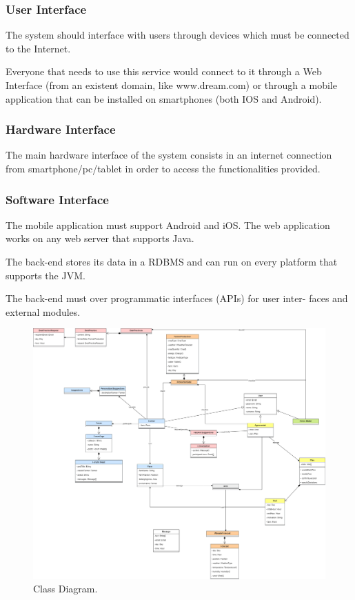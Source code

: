 \documentclass{article}
\begin{document}
\subsubsection{User Interface}

    The system should interface with users through devices which must be connected
    to the Internet.
    
    Everyone that needs to use this service would connect to it through a Web
    Interface (from an existent domain, like www.dream.com) or through a mobile
    application that can be installed on smartphones (both IOS and Android).

\subsubsection{Hardware Interface}

    The main hardware interface of the system consists in an internet connection from smartphone/pc/tablet in order to access the functionalities provided.

\subsubsection{Software Interface}

    The mobile application must support Android and iOS. The web application
    works on any web server that supports Java.
    
    The back-end stores its data in a RDBMS and can run on every platform
    that supports the JVM.
    
    The back-end must over programmatic interfaces (APIs) for user inter-
    faces and external modules.

    \begin{figure} [h]
        \centering
        \includegraphics[width=1\textwidth]{images/ClassDiagram.png}
        \caption{\label{fig:frog}Class Diagram.}
    \end{figure}
    
\end{document}
